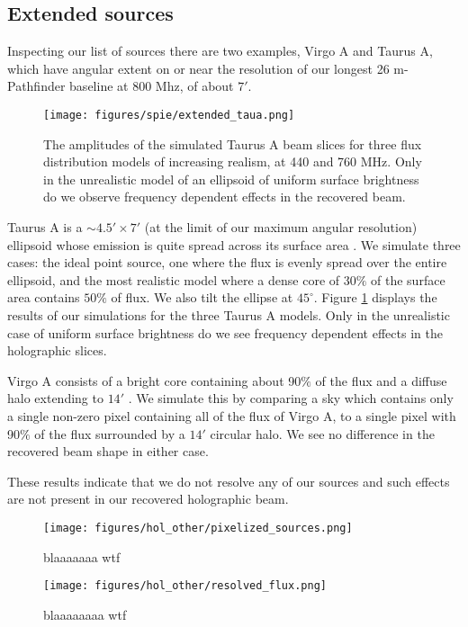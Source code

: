 \subsection{Extended sources}

Inspecting our list of sources there are two examples, Virgo A and Taurus A, which have angular extent on or near the resolution of our longest 26 m-Pathfinder baseline at 800 Mhz, of about $7'$. 
\begin{figure}[h!] %
	\centering	
	\texttt{[image: figures/spie/extended\_taua.png]}%
	\caption{The amplitudes of the simulated Taurus A beam slices for three flux distribution models of increasing realism, at 440 and 760 MHz. Only in the unrealistic model of an ellipsoid of uniform surface brightness do we observe frequency dependent effects in the recovered beam.}
	\label{crabsim}
\end{figure}

Taurus A is a $\sim 4.5'\times 7'$ (at the limit of our maximum angular resolution) ellipsoid whose emission is quite spread across its surface area \citep{crab}. We simulate three cases: the ideal point source, one where the flux is evenly spread over the entire ellipsoid, and the most realistic model where a dense core of $30\%$ of the surface area contains $50\%$ of flux. We also tilt the ellipse at $45^{\circ}$. Figure \ref{crabsim} displays the results of our simulations for the three Taurus A models. Only in the unrealistic case of uniform surface brightness do we see frequency dependent effects in the holographic slices.

Virgo A consists of a bright core containing about 90$\%$ of the flux and a diffuse halo extending to $14'$ \citep{baars, m87lofar}. We simulate this by comparing a sky which contains only a single non-zero pixel containing all of the flux of Virgo A, to a single pixel with 90$\%$ of the flux surrounded by a $14'$ circular halo. We see no difference in the recovered beam shape in either case.

These results indicate that we do not resolve any of our sources and such effects are not present in our recovered holographic beam.

\begin{figure}[h!]
\texttt{[image: figures/hol\_other/pixelized\_sources.png]}
\caption{blaaaaaaa wtf}
\label{pixelized_sources}
\end{figure} 

\begin{figure}[h!]
\texttt{[image: figures/hol\_other/resolved\_flux.png]}
\caption{blaaaaaaaa wtf}
\label{resolved_flux}
\end{figure} 


